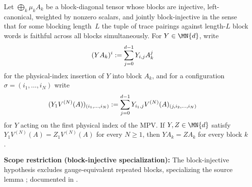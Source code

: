 \begin{lemma}
    \label{lem:blockwise_insert_eq_of_mpv_agree}
    \leanok
    Let $\bigoplus_k \mu_k A_k$ be a block-diagonal tensor whose blocks are
    injective, left-canonical, weighted by nonzero scalars, and jointly
    block-injective in the sense that for some blocking length~$L$ the tuple
    of trace pairings against length-$L$ block words is faithful across all
    blocks simultaneously.
    For $Y\in \MN{d}$, write
    \begin{align}
        (YA_k)^i
         & := \sum_{j=0}^{d-1}Y_{i,j}A_k^j
        \notag
    \end{align}
    for the physical-index insertion of $Y$ into block $A_k$, and for a
    configuration $\sigma=(i_1,\ldots,i_N)$ write
    \begin{align}
        (Y_1V^{(N)}(A))_{(i_1,\ldots,i_N)}
         & := \sum_{j=0}^{d-1}Y_{i_1,j}
        V^{(N)}(A)_{(j,i_2,\ldots,i_N)}
        \notag
    \end{align}
    for $Y$ acting on the first physical index of the MPV.
    If $Y,Z\in \MN{d}$ satisfy
    $Y_1V^{(N)}(A)=Z_1V^{(N)}(A)$ for every $N\geq1$, then
    $YA_k=ZA_k$ for every block $k$.

    \textbf{Scope restriction (block-injective specialization):}
    The block-injective hypothesis excludes gauge-equivalent repeated blocks,
    specializing the source lemma \cite[Lemma~L]{Cirac2016MPDO_arXiv}; documented in
    \cite{gap:cpgsv17_bicf_block_separation}.
\end{lemma}


